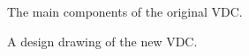 \documentclass[11pt]{report}
\begin{document}
\begin{figure}
\centerline{\vspace{0cm}\hspace{0cm}
}
\centering
\caption{The main components of the original VDC. }
\label{fig:vdc}
\end{figure} 


\begin{figure}

\centerline{\vspace{0cm}\hspace{0cm}
}
\centering
\caption{A design drawing of the new VDC.}
\label{fig:vdc-new-fig}
\end{figure} 
\end{document}

